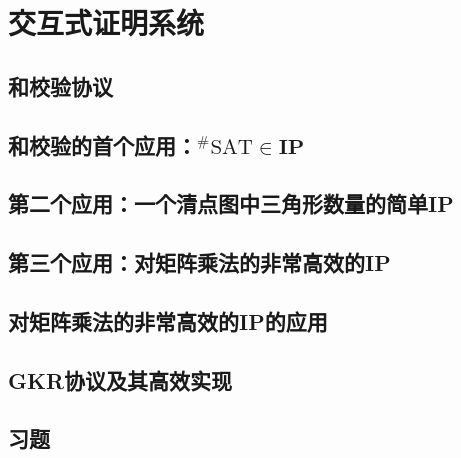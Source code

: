 \chapter{交互式证明系统}\label{chp:04IP}
\section{和校验协议}\label{4.1}
\section{和校验的首个应用：$^\# \mathrm{SAT} \in \mathbf{I P}$}\label{4.2}
\section{第二个应用：一个清点图中三角形数量的简单IP}\label{4.3}
\section{第三个应用：对矩阵乘法的非常高效的IP}\label{4.4}
\section{对矩阵乘法的非常高效的IP的应用}\label{4.5}
\section{GKR协议及其高效实现}\label{4.6}
\section{习题}\label{4.7}